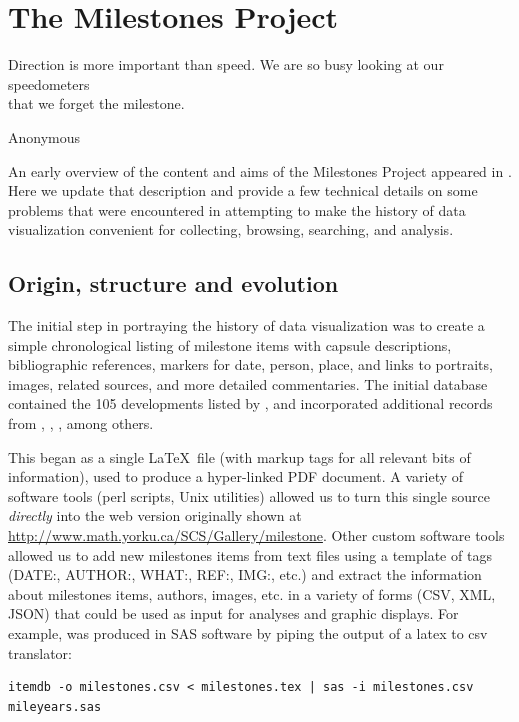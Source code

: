 \section{The Milestones Project}\label{sec:project}
\epigraph{Direction is more important than speed. We are so busy looking at our 
speedometers \\ that we forget the milestone.}{Anonymous} 

An early overview of the content and aims of the Milestones Project appeared in 
\cite{Friendly:04:gfkl}. 
Here we update that description and provide a few technical details on some 
problems that were encountered in attempting to make the history of data 
visualization convenient for collecting, browsing, searching, and analysis.

\subsection{Origin, structure and evolution}\label{sec:structure}
The initial step in portraying the history of data visualization was to create 
a simple chronological listing of milestone items with capsule descriptions, 
bibliographic references, markers for date, person, place, and links to 
portraits, images, related sources, and more detailed commentaries. 
The initial 
database contained the 105 developments listed by \citet{BenigerRobyn:1978}, 
and incorporated additional records from \citet{Hankins:1999}, 
\citet{Tufte:1983,Tufte:1990,Tufte:1997}, \citet{Heiser:2000}, among others.

This began as a single \LaTeX\ file (with markup tags for all relevant bits of 
information), used to produce a hyper-linked PDF document.  
A variety of 
software tools (perl scripts, Unix utilities) allowed us to turn this single 
source \emph{directly} into the web version originally shown at
\url{http://www.math.yorku.ca/SCS/Gallery/milestone}.  
Other custom software 
tools allowed us to add new milestones items from text files using a template 
of tags (DATE:, AUTHOR:, WHAT:, REF:, IMG:, etc.) and extract the information 
about milestones items, authors, images, etc. in a variety of forms (CSV, XML, 
JSON) that could be used as input for analyses and graphic displays.  
For example,  was produced in SAS software by piping the 
output of a latex to csv translator:
\begin{verbatim} 
itemdb -o milestones.csv < milestones.tex | sas -i milestones.csv mileyears.sas 
\end{verbatim}

